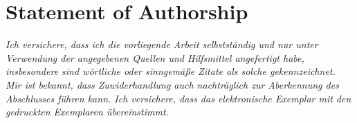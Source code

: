 \vspace*{\fill}
\noindent

\hypertarget{statement}{%
\chapter*{Statement of Authorship}\label{statement}}

\textit{Ich versichere, dass ich die vorliegende Arbeit selbstständig und nur unter Verwendung der angegebenen Quellen und Hilfsmittel angefertigt habe, insbesondere sind wörtliche oder sinngemäße Zitate als solche gekennzeichnet. Mir ist bekannt, dass Zuwiderhandlung auch nachträglich zur Aberkennung des Abschlusses führen kann. Ich versichere, dass das elektronische Exemplar mit den gedruckten Exemplaren übereinstimmt.}


\vspace*{\fill}

